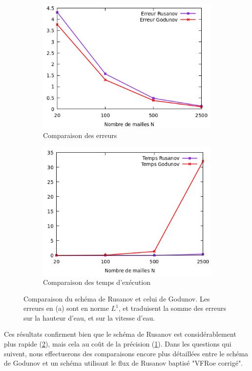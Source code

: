 \documentclass[
	french,
	11pt, %
]{fphw}
\begin{document}
\begin{figure}[H]
	\centering
	\begin{subfigure}[b]{0.45\textwidth}
		\centering
		\includegraphics[width=\textwidth]{rusaVSgoduERR.png}
		\caption{Comparaison des erreurs}
		\label{fig:rusaVSgoduA}
	\end{subfigure}
	\begin{subfigure}[b]{0.45\textwidth}
		\centering
		\includegraphics[width=\textwidth]{rusaVSgoduTIME.png}
		\caption{Comparaison des temps d'exécution}
		\label{fig:rusaVSgoduB}
	\end{subfigure}
	\caption{Comparaison du schéma de Rusanov et celui de Godunov. Les erreurs en (a) sont en norme $L^1$, et traduisent la somme des erreurs sur la hauteur d'eau, et sur la vitesse d'eau.}
	\label{fig:rusaVSgodu}
\end{figure}
Ces résultats confirment bien que le schéma de Rusanov est considérablement plus rapide (\cref{fig:rusaVSgoduB}), mais cela au coût de la précision (\cref{fig:rusaVSgoduA}). Dans les questions qui suivent, nous effectuerons des comparaisons encore plus détaillées entre le schéma de Godunov et un schéma utilisant le flux de Rusanov baptisé "VFRoe corrigé".
\end{document}
